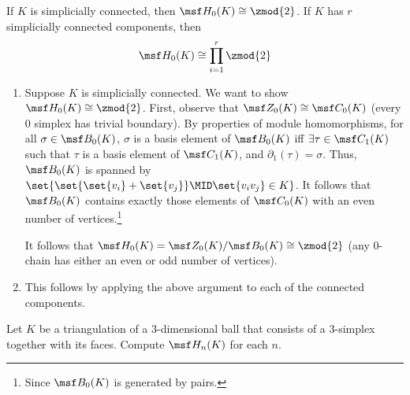 \begin{problem}[16.8]
  If $K$ is simplicially connected, then $\msf H_0(K) \cong \zmod{2}$. If $K$
  has $r$ simplicially connected components, then
  \[
    \msf H_0(K)\cong \prod_{i=1}^r \zmod{2}
  \]
\end{problem}
\begin{solution}
  \begin{enumerate}
  \item Suppose $K$ is simplicially connected. We want to show $\msf H_0(K)
    \cong \zmod{2}$. First, observe that $\msf Z_0(K) \cong \msf C_0(K)$
    (every 0 simplex has trivial boundary). By properties of module
    homomorphisms, for all $\sigma \in \msf B_0(K)$, $\sigma$ is a basis
    element of $\msf B_0(K)$ iff $\exists \tau \in \msf C_1(K)$ such that
    $\tau$ is a basis element of $\msf C_1(K)$, and $\partial_1(\tau) =
    \sigma$. Thus, $\msf B_0(K)$ is spanned by $\set{\set{\set{v_i} +
        \set{v_j}} \MID \set{v_iv_j} \in K}$. It follows that $\msf B_0(K)$
    contains exactly those elements of $\msf C_0(K)$ with an even number of
    vertices.\footnote{Since $\msf B_0(K)$ is generated by pairs.}

    It follows that $\msf H_0(K) = \msf Z_0(K)/\msf B_0(K) \cong \zmod{2}$
    (any $0$-chain has either an even or odd number of vertices).
  \item This follows by applying the above argument to each of the connected
    components.
  \end{enumerate}
\end{solution}
\begin{problem}[16.9]
  Let $K$ be a triangulation of a $3$-dimensional ball that consists of a
  3-simplex together with its faces. Compute $\msf H_n(K)$ for each $n$.
\end{problem}
